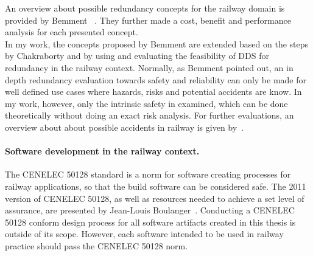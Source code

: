 An overview about possible redundancy concepts for the railway domain is provided by Bemment \etal~\cite{BemmentEvaluationOfRedundancy}.
They further made a cost, benefit and performance analysis for each presented concept.
\\

In my work, the concepts proposed by Bemment \etal are extended based on the steps by Chakraborty and by using and evaluating the feasibility of \gls*{DDS} for redundancy in the railway context.
Normally, as Bemment \etal pointed out, an in depth redundancy evaluation towards safety and reliability can only be made for well defined use cases where hazards, risks and potential accidents are know.
In my work, however, only the intrinsic safety in examined, which can be done theoretically without doing an exact risk analysis.
For further evaluations, an overview about about possible accidents in railway is given by~\cite{ERTMSRailwayAccidents}.
\\

\paragraph{Software development in the railway context.}
The CENELEC 50128 standard is a norm for software creating processes for railway applications, so that the build software can be considered safe.
The 2011 version of CENELEC 50128, as well as resources needed to achieve a set level of assurance, are presented by Jean-Louis Boulanger~\cite{BoulangerStandards}.
Conducting a CENELEC 50128 conform design process for all software artifacts created in this thesis is outside of its scope.
However, each software intended to be used in railway practice should pass the CENELEC 50128 norm.
\\

